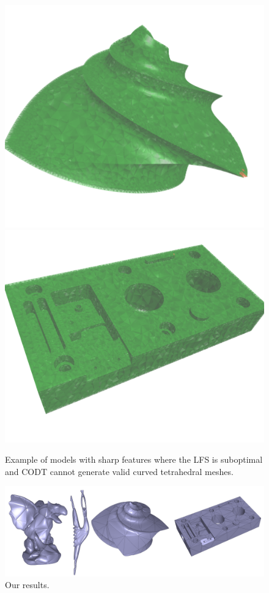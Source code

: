 \documentclass[acmtog,anonymous,review]{acmart}
\begin{document}
\begin{figure}
    \centering
    \includegraphics[width=.45\linewidth]{addional_figs/octa.png}
    \includegraphics[width=.45\linewidth]{addional_figs/mech.png}
    \caption{Example of models with sharp features where the LFS is suboptimal and CODT cannot generate valid curved tetrahedral meshes.}
    \label{bichon:fig:features}
\end{figure}


\begin{figure}
    \centering
    \includegraphics[width=.9\linewidth]{addional_figs/additional_mp.pdf}
    \caption{Our results.}
\end{figure}
\end{document}
